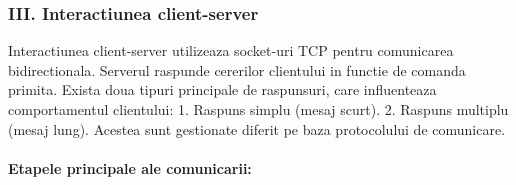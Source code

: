 \documentclass[runningheads]{llncs}
\begin{document}
\subsubsection*{III. Interactiunea client-server}

Interactiunea client-server utilizeaza socket-uri TCP pentru comunicarea bidirectionala. Serverul raspunde cererilor clientului in functie de comanda primita. Exista doua tipuri principale de raspunsuri, care influenteaza comportamentul clientului: 
1. Raspuns simplu (mesaj scurt).
2. Raspuns multiplu (mesaj lung). Acestea sunt gestionate diferit pe baza protocolului de comunicare.

\paragraph{Etapele principale ale comunicarii:}
\end{document}
